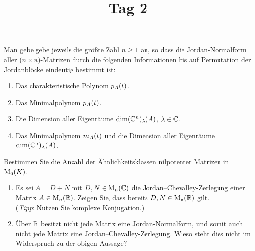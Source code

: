 \documentclass[a4paper, 10pt]{scrartcl}
\title{Tag 2}
\author{}
\date{}
\begin{document}
\begin{question}
  Man gebe gebe jeweils die größte Zahl $n \geq 1$ an, so dass die Jordan-Normalform aller ($n \times n$)-Matrizen durch die folgenden Informationen bis auf Permutation der Jordanblöcke eindeutig bestimmt ist:
  \begin{enumerate}
    \item
      Das charakteristische Polynom $p_{A}(t)$.
    \item
      Das Minimalpolynom $p_{A}(t)$.
    \item
      Die Dimension aller Eigenräume $\dim (\mathbb{C}^n)_{\lambda}(A)$, $\lambda \in \mathbb{C}$.
    \item
      Das Minimalpolynom $m_{A}(t)$ und die Dimension aller Eigenräume $\dim (\mathbb{C}^n)_{\lambda}(A)$.
  \end{enumerate}
\end{question}










\begin{question}
  Bestimmen Sie die Anzahl der Ähnlichkeitsklassen nilpotenter Matrizen in $\operatorname{M}_{6}(K)$.
\end{question}





\begin{question}
  \begin{enumerate}
    \item
      Es sei $A = D + N$ mit $D, N \in \operatorname{M}_{n}(\mathbb{C})$ die Jordan--Chevalley-Zerlegung einer Matrix $A \in \operatorname{M}_{n}(\mathbb{R})$.
      Zeigen Sie, dass bereits $D, N \in \operatorname{M}_{n}(\mathbb{R})$ gilt.
      \\
      (\emph{Tipp}:
       Nutzen Sie komplexe Konjugation.)
    \item
      Über $\mathbb{R}$ besitzt nicht jede Matrix eine Jordan-Normalform, und somit auch nicht jede Matrix eine Jordan--Chevalley-Zerlegung.
      Wieso steht dies nicht im Widerspruch zu der obigen Aussage?
  \end{enumerate}
\end{question}
\end{document}

